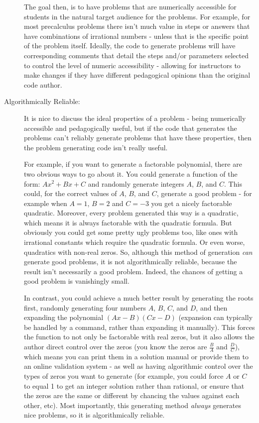 \documentclass{article}
\begin{document}
\begin{description}
                The goal then, is to have problems that are numerically accessible for students in the natural target audience for the problems. For example, for most precalculus problems there isn't much value in steps or answers that have combinations of irrational numbers - unless that is the specific point of the problem itself. Ideally, the code to generate problems will have corresponding comments that detail the steps and/or parameters selected to control the level of numeric accessibility - allowing for instructors to make changes if they have different pedagogical opinions than the original code author. 
                
            \item[Algorithmically Reliable:]
                It is nice to discuss the ideal properties of a problem - being numerically accessible and pedagogically useful, but if the code that generates the problems can't reliably generate problems that have these properties, then the problem generating code isn't really useful. 
                
                For example, if you want to generate a factorable polynomial, there are two obvious ways to go about it. You could generate a function of the form: $Ax^2 + Bx + C$ and randomly generate integers $A$, $B$, and $C$. This could, for the correct values of $A$, $B$, and $C$, generate a good problem - for example when $A=1$, $B = 2$ and $C=-3$ you get a nicely factorable quadratic. Moreover, every problem generated this way is a quadratic, which means it is always factorable with the quadratic formula. But obviously you could get some pretty ugly problems too, like ones with irrational constants which require the quadratic formula. Or even worse, quadratics with non-real zeros. So, although this method of generation \textit{can} generate good problems, it is not algorithmically reliable, because the result isn't necessarily a good problem. Indeed, the chances of getting a good problem is vanishingly small.
                
                In contrast, you could achieve a much better result by generating the roots first, randomly generating four numbers $A$, $B$, $C$, and $D$, and then expanding the polynomial $(Ax - B)(Cx - D)$ (expansion can typically be handled by a command, rather than expanding it manually). This forces the function to not only be factorable with real zeros, but it also allows the author direct control over the zeros (you know the zeros are $\frac{B}{A}$ and $\frac{D}{C}$), which means you can print them in a solution manual or provide them to an online validation system - as well as having algorithmic control over the types of zeros you want to generate (for example, you could force $A$ or $C$ to equal 1 to get an integer solution rather than rational, or ensure that the zeros are the same or different by chancing the values against each other, etc). Most importantly, this generating method \textit{always} generates nice problems, so it is algorithmically reliable.
                
        \end{description}
    
\end{document}
